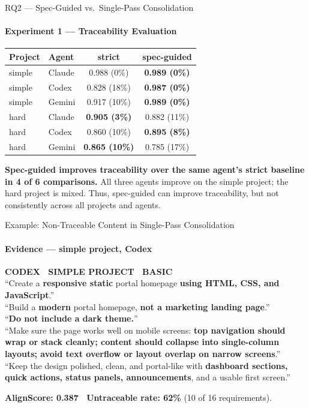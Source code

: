 \documentclass[aspectratio=169,11pt,c]{beamer}
\newcommand{\quotewho}[1]{{\footnotesize\bfseries\color{accentorange}\MakeUppercase{#1}}\\[2pt]}
\begin{document}
\begin{frame}{RQ2 --- Spec-Guided vs.\ Single-Pass Consolidation}
  \framesubtitle{Experiment 1 --- Traceability Evaluation}
  \begin{center}\scriptsize
  \begin{tabular}{llcc}
    \toprule
    \textbf{Project} & \textbf{Agent} & \textbf{strict} & \textbf{spec-guided} \\
    \midrule
    simple & Claude & 0.988 (0\%) & \textbf{\textcolor{primaryblue}{0.989 (0\%)}} \\
    simple & Codex & 0.828 (18\%) & \textbf{\textcolor{primaryblue}{0.987 (0\%)}} \\
    simple & Gemini & 0.917 (10\%) & \textbf{\textcolor{primaryblue}{0.989 (0\%)}} \\
    hard & Claude & \textbf{\textcolor{primaryblue}{0.905 (3\%)}} & 0.882 (11\%) \\
    hard & Codex & 0.860 (10\%) & \textbf{\textcolor{primaryblue}{0.895 (8\%)}} \\
    hard & Gemini & \textbf{\textcolor{primaryblue}{0.865 (10\%)}} & 0.785 (17\%) \\
    \bottomrule
  \end{tabular}
  \end{center}
  \begin{calloutbox}
    \scriptsize\textbf{Spec-guided improves traceability over the same agent's strict baseline in 4 of 6 comparisons.} All three agents improve on the simple project; the hard project is mixed. Thus, spec-guided can improve traceability, but not consistently across all projects and agents.
  \end{calloutbox}
  \vspace{4pt}
\end{frame}

\begin{frame}{Example: Non-Traceable Content in Single-Pass Consolidation}
  \framesubtitle{Evidence --- simple project, Codex}
  \begin{quotebox}
    \footnotesize\quotewho{Codex \textperiodcentered\ Simple project \textperiodcentered\ Basic}
    ``Create a \textbf{responsive static} portal homepage \textbf{using HTML, CSS, and JavaScript}.'' \\
    ``Build a \textbf{modern} portal homepage, \textbf{not a marketing landing page}.'' \\
    ``\textbf{Do not include a dark theme.}'' \\
    ``Make sure the page works well on mobile screens: \textbf{top navigation should wrap or stack cleanly; content should collapse into single-column layouts; avoid text overflow or layout overlap on narrow screens}.'' \\
    ``Keep the design polished, clean, and portal-like with \textbf{dashboard sections, quick actions, status panels, announcements}, and a usable first screen.''
  \end{quotebox}
  \begin{calloutbox}
    \textbf{AlignScore: 0.387 \textperiodcentered\ Untraceable rate: 62\%} (10 of 16 requirements).
  \end{calloutbox}
\end{frame}
\end{document}
